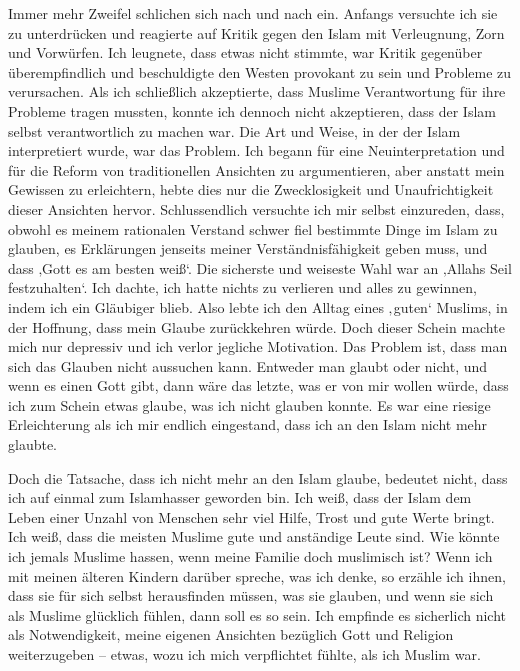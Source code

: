 \documentclass[12pt]{memoir}
\begin{document}
Immer mehr Zweifel schlichen sich nach und nach ein.
Anfangs versuchte ich sie zu unterdrücken und reagierte auf Kritik
gegen den Islam mit Verleugnung, Zorn und Vorwürfen.
Ich leugnete, dass etwas nicht stimmte,
war Kritik gegenüber überempfindlich und beschuldigte den Westen
provokant zu sein und Probleme zu verursachen.
Als ich schließlich akzeptierte, dass Muslime Verantwortung
für ihre Probleme tragen mussten,
konnte ich dennoch nicht akzeptieren,
dass der Islam selbst verantwortlich zu machen war.
Die Art und Weise, in der der Islam interpretiert wurde,
war das Problem. Ich begann für eine Neuinterpretation
und für die Reform von traditionellen Ansichten zu argumentieren,
aber anstatt mein Gewissen zu erleichtern,
hebte dies nur die Zwecklosigkeit
und Unaufrichtigkeit dieser Ansichten hervor.
Schlussendlich versuchte ich mir selbst einzureden, dass,
obwohl es meinem rationalen Verstand schwer fiel
bestimmte Dinge im Islam zu glauben,
es Erklärungen jenseits meiner Verständnisfähigkeit geben muss,
und dass ‚Gott es am besten weiß‘.
Die sicherste und weiseste Wahl war an ‚Allahs Seil festzuhalten‘.
Ich dachte, ich hatte nichts zu verlieren und alles zu gewinnen,
indem ich ein Gläubiger blieb.
Also lebte ich den Alltag eines ‚guten‘ Muslims, in der Hoffnung,
dass mein Glaube zurückkehren würde.
Doch dieser Schein machte mich nur depressiv
und ich verlor jegliche Motivation.
Das Problem ist, dass man sich das Glauben nicht aussuchen kann.
Entweder man glaubt oder nicht, und wenn es einen Gott gibt,
dann wäre das letzte, was er von mir wollen würde,
dass ich zum Schein etwas glaube, was ich nicht glauben konnte.
Es war eine riesige Erleichterung als ich mir endlich eingestand,
dass ich an den Islam nicht mehr glaubte.

Doch die Tatsache, dass ich nicht mehr an den Islam glaube,
bedeutet nicht, dass ich auf einmal zum Islamhasser geworden bin.
Ich weiß, dass der Islam dem Leben einer Unzahl von Menschen sehr viel Hilfe,
Trost und gute Werte bringt.
Ich weiß, dass die meisten Muslime gute und anständige Leute sind.
Wie könnte ich jemals Muslime hassen, wenn meine Familie doch muslimisch ist?
Wenn ich mit meinen älteren Kindern darüber spreche, was ich denke,
so erzähle ich ihnen, dass sie für sich selbst herausfinden müssen,
was sie glauben, und wenn sie sich als Muslime glücklich fühlen,
dann soll es so sein.
Ich empfinde es sicherlich nicht als Notwendigkeit,
meine eigenen Ansichten bezüglich Gott und Religion weiterzugeben –
etwas, wozu ich mich verpflichtet fühlte, als ich Muslim war.
\end{document}
